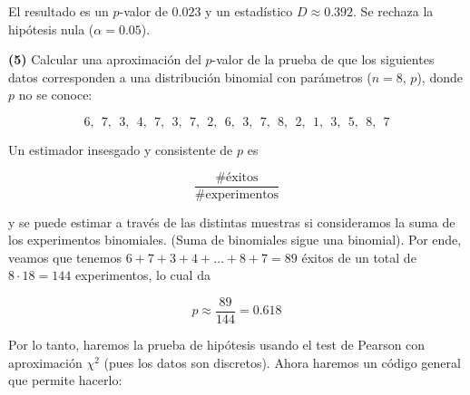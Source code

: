 \documentclass[a4paper, 12pt]{article}
\begin{document}
El resultado es un $p$-valor de $0.023$ y un estadístico $D \approx 0.392$. Se
rechaza la hipótesis nula ($\alpha = 0.05$).

\pagebreak 

\begin{myframe}
    \textbf{(5)} Calcular una aproximación del $p$-valor de la prueba de que los
    siguientes datos corresponden a una distribución binomial con parámetros ($n
    = 8$, $p$), donde $p$ no se conoce: 

    $$6,~~ 7,~~ 3,~~ 4,~~ 7,~~ 3,~~ 7,~~ 2,~~ 6,~~ 3,~~ 7,~~ 8,~~ 2,~~ 1,~~ 3,~~ 5,~~ 8,~~ 7$$
\end{myframe}

Un estimador insesgado y consistente de $p$ es 

\begin{equation*}
    \frac{\# \text{éxitos}}{\# \text{experimentos}}
\end{equation*}

y se puede estimar a través de las distintas muestras si consideramos la suma de
los experimentos binomiales. (Suma de binomiales sigue una binomial). Por ende,
veamos que tenemos $6 + 7 + 3 + 4 + \ldots + 8 + 7 = 89$ éxitos de un total de
$8 \cdot 18 = 144$ experimentos, lo cual da 

\begin{equation*}
    p \approx \frac{89}{144} = 0.618
\end{equation*}

Por lo tanto, haremos la prueba de hipótesis usando el test de Pearson con
aproximación $\chi^2$ (pues los datos son discretos). Ahora haremos un código
general que permite hacerlo:

\pagebreak
\end{document}
